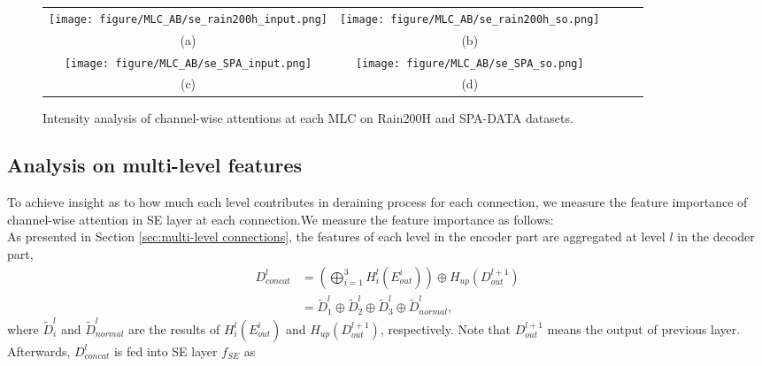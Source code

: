 \documentclass[a4paper,fleqn]{cas-dc}
\begin{document}
\begin{figure*}[!h]\footnotesize
	\centering
	\setlength{\tabcolsep}{0pt}
	
	\begin{tabular}{cclcclccl}
		\multicolumn{3}{c}{\texttt{[image: figure/MLC\_AB/se\_rain200h\_input.png]}} &
		\multicolumn{3}{c}{\texttt{[image: figure/MLC\_AB/se\_rain200h\_so.png]}} \\
		\multicolumn{3}{c}{(a)} &
		\multicolumn{3}{c}{(b)} \\
		\multicolumn{3}{c}{\texttt{[image: figure/MLC\_AB/se\_SPA\_input.png]}} &
		\multicolumn{3}{c}{\texttt{[image: figure/MLC\_AB/se\_SPA\_so.png]}} \\
		\multicolumn{3}{c}{(c)} &
		\multicolumn{3}{c}{(d)}
		
	\end{tabular}
	\caption{ Intensity analysis of channel-wise attentions at each MLC on Rain200H and SPA-DATA datasets.}

	\label{fig:se_analysis}
\end{figure*}


\subsection{Analysis on multi-level features}

To achieve insight as to how much each level contributes in deraining process for each  connection, we measure the feature importance of channel-wise attention in SE layer at each connection.We measure the feature importance as follows: \\
As presented in Section \ref{sec:multi-level connections}, the features of each level in the encoder part are aggregated at level $l$ in the decoder part, 
\begin{align}
    D_{concat}^l &=  (\bigoplus_{i=1}^{3} H_{i}^{l} ( E_{out}^{i} ) )\oplus H_{up}(D_{out}^{l+1}) \\ 
     &=  \tilde{D}_{1}^l \oplus \tilde{D}_{2}^l \oplus \tilde{D}_{3}^l \oplus \tilde{D}_{normal}^l,
\end{align} 
where $\tilde{D}_{i}^l$ and $\tilde{D}_{normal}^l$ are the results of $H_{i}^{l} ( E_{out}^{i} ) $ and $ H_{up}(D_{out}^{l+1}) $, respectively. Note that $D_{out}^{l+1}$ means the output of previous layer. Afterwards, $D_{concat}^l$ is fed into SE layer $f_{SE}$ as
\end{document}
